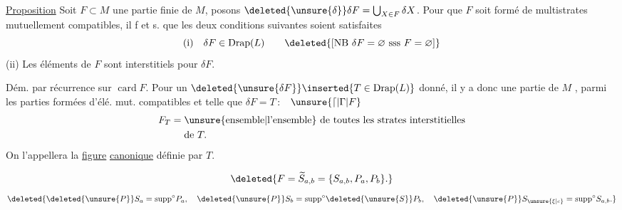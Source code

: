 \uline{Proposition} Soit $F\subset M$ une partie finie  de $M$, posons $\deleted{\unsure{\delta}}\delta F=\bigcup_{X\in F}\delta X$. Pour que $F$ soit formé de multistrates mutuellement compatibles, il f et s. que les deux conditions suivantes soient satisfaites
\[
 \text{(i)}\quad\delta F\in\mathrm{Drap}(L)
 \qquad\deleted{[\text{NB }\delta F=\varnothing\ \text{sss}\ F=\varnothing]}
\]
(ii) Les éléments de $F$ sont interstitiels pour $\delta F$.

Dém. par récurrence sur $\operatorname{card}F$.  Pour un $\deleted{\unsure{\delta F}}\inserted{T\in\mathrm{Drap}(L)}$ donné, il y a donc une partie de $M$  , parmi les parties  formées d'élé. mut. compatibles et telle que $\delta F=T$\,:\ \ $\unsure{\lceil|\Gamma|F}$
\[
 \begin{aligned}
 F_T={}&\text{\unsure{ensemble|l'ensemble} de toutes les strates interstitielles}\\
 &\text{de }T.
 \end{aligned}
\]
On l'appellera la \uline{figure} \uline{canonique} définie par $T$.

\[
 \deleted{F=\widetilde S_{a,b}=\{S_{a,b},P_a,P_b\}.}
\]
\[
 \deleted{\deleted{\unsure{P}}S_a=\mathrm{supp}^{\circ}P_a,\quad
         \deleted{\unsure{P}}S_b=\mathrm{supp}^{\circ}\deleted{\unsure{S}}P_b,\quad
         \deleted{\unsure{P}}S_{\unsure{\xi|c}}=\mathrm{supp}^{\circ}S_{a,b}.}
\]

